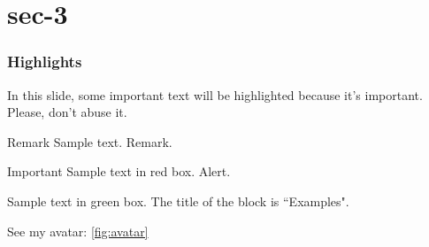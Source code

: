 \documentclass{beamer}
\begin{document}
\section{sec-3}

\begin{frame}
    \frametitle{Highlights}
    
    In this slide, some important text will be
    \alert{highlighted} because it's important.
    Please, don't abuse it.
    
    \begin{block}{Remark}
    Sample text. Remark.
    \end{block}
    
    \begin{alertblock}{Important}
    Sample text in red box. Alert.
    \end{alertblock}
    
    \begin{examples}
    Sample text in green box. The title of the block is ``Examples".
    \end{examples}

    See my avatar: \ref{fig:avatar}

\end{frame}

\frame{\printbibliography}
\end{document}
